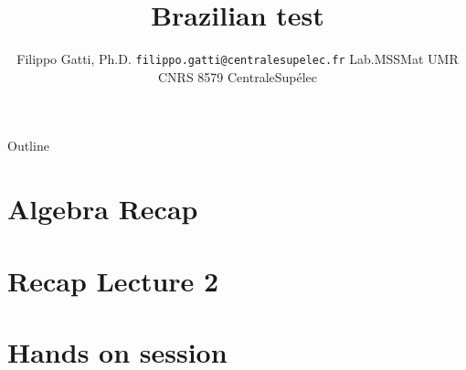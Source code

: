 \documentclass[usenames,dvipsnames]{beamer}
\title[CentraleSupélec]{Brazilian test}
\author[Filippo Gatti]{
  Filippo Gatti, Ph.D.
  \pdfnewline
  \texttt{filippo.gatti@centralesupelec.fr}
  \pdfnewline  Lab.MSSMat UMR CNRS 8579
  \pdfnewline CentraleSupélec
}
\institute{Mechanics}
\newcommand{\writeup}{.}
\newcommand{\presentations}{\writeup}
\newcommand{\runfolder}{\presentations}
\newcommand{\runsections}{\runfolder/sections}
\begin{document}
\begin{frame}
\titlepage
\end{frame}

\begin{frame}{Outline}
\tableofcontents
\end{frame}

\section{Algebra Recap}


\section{Recap Lecture 2}


\section{Hands on session}



%
%
%
%
%
%
%
\end{document}
